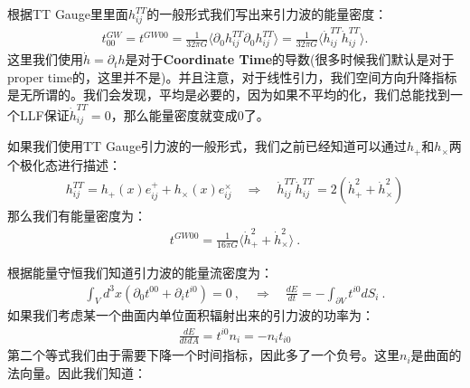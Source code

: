 \bigskip
{}

根据TT Gauge里里面$ h_{ij}^{TT} $的一般形式我们写出来引力波的能量密度：
\begin{align}
  t_{00}^{GW} = t^{GW 00} = \frac{1}{32\pi G}\langle \partial_0
  h_{ij}^{TT} \partial_0 h_{ij}^{TT} \rangle = \frac{1}{32\pi
  G}\langle \dot{h}_{ij}^{TT} \dot{h}_{ij}^{TT} \rangle.
\end{align}
这里我们使用$ \dot{h} = \partial_t h $是对于\textbf{Coordinate
Time}的导数(很多时候我们默认是对于proper
time的，这里并不是)。并且注意，对于线性引力，我们空间方向升降指标是无所谓的。我们会发现，平均是必要的，因为如果不平均的化，我们总能找到一个LLF保证$
\dot{h}_{ij}^{TT} = 0 $，那么能量密度就变成0了。

如果我们使用TT Gauge引力波的一般形式，我们之前已经知道可以通过$ h_+ $和$ h_\times $两个极化态进行描述：
\begin{align}
  h_{ij}^{TT} = h_+(x) e_{ij}^+ + h_\times(x) e_{ij}^\times  \quad
  \Rightarrow \quad \dot{h}_{ij}^{TT} \dot{h}_{ij}^{TT} =
  2(\dot{h}_+^2 + \dot{h}_\times^2)
\end{align}
那么我们有能量密度为：
\begin{align}
  t^{GW 00}=\frac{1}{16\pi
  G}\langle\dot{h}_+^2+\dot{h}_\times^2\rangle\mathrm{~.}
\end{align}

\bigskip
{}

根据能量守恒我们知道引力波的能量流密度为：
\begin{align}
  \int_Vd^3x\left(\partial_0t^{00}+\partial_it^{i0}\right)=0\mathrm{~,}
  \quad \Rightarrow \quad \frac{dE}{dt}=-\int_{\partial V}t^{i0}dS_i\mathrm{~.}
\end{align}
如果我们考虑某一个曲面内单位面积辐射出来的引力波的功率为：
\begin{align}
  \frac{dE}{dtdA}=t^{i0}n_i = -n_i t_{i0}
\end{align}
第二个等式我们由于需要下降一个时间指标，因此多了一个负号。这里$ n_i $是曲面的法向量。因此我们知道：

\bigskip
{}

